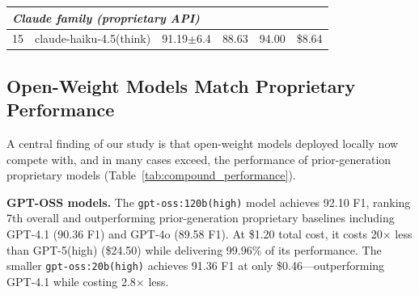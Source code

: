 \documentclass[runningheads]{llncs}
\begin{document}
\begin{table}[!ht]
\begin{tabular}{rlcccc}
\midrule
\multicolumn{6}{l}{\emph{Claude family (proprietary API)}} \\
\midrule
15 & claude-haiku-4.5(think) & 91.19$\pm$6.4 & 88.63 & 94.00 & \$8.64 \\
\bottomrule
\end{tabular}
\end{table}

\subsection{Open-Weight Models Match Proprietary Performance}

A central finding of our study is that open-weight models deployed locally now compete with, and in many cases exceed, the performance of prior-generation proprietary models (Table~\ref{tab:compound_performance}).

\textbf{GPT-OSS models.} The \texttt{gpt-oss:120b(high)} model achieves 92.10 F1, ranking 7th overall and outperforming prior-generation proprietary baselines including GPT-4.1 (90.36 F1) and GPT-4o (89.58 F1). At \$1.20 total cost, it costs 20$\times$ less than GPT-5(high) (\$24.50) while delivering 99.96\% of its performance. The smaller \texttt{gpt-oss:20b(high)} achieves 91.36 F1 at only \$0.46---outperforming GPT-4.1 while costing 2.8$\times$ less.
\end{document}
